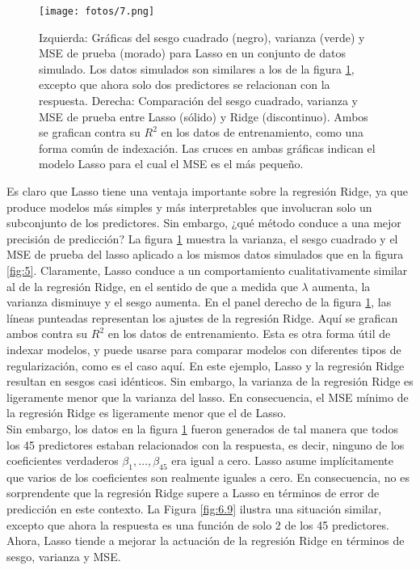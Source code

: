 \begin{figure}[h]
\centering
\texttt{[image: fotos/7.png]}
\caption{Izquierda: Gráficas del sesgo cuadrado (negro), varianza (verde) y MSE de prueba (morado) para Lasso en un conjunto de datos simulado. Los datos simulados son similares a los de la figura \ref{fig:6.8}, excepto que ahora solo dos predictores se relacionan con la respuesta. Derecha: Comparación del sesgo cuadrado, varianza y MSE de prueba entre Lasso (sólido) y Ridge (discontinuo). Ambos se grafican contra su $R^2$ en los datos de entrenamiento, como una forma común de indexación. Las cruces en ambas gráficas indican el modelo Lasso para el cual el MSE es el más pequeño.}
\label{fig:6.8}
\end{figure}

Es claro que Lasso tiene una ventaja importante sobre la regresión Ridge, ya que produce modelos más simples y más interpretables que involucran solo un subconjunto de los predictores. Sin embargo, ¿qué método conduce a una mejor precisión de predicción? La figura \ref{fig:6.8} muestra la varianza, el sesgo cuadrado y el MSE de prueba del lasso aplicado a los mismos datos simulados que en la figura \ref{fig:5}. Claramente, Lasso conduce a un comportamiento cualitativamente similar al de la regresión Ridge, en el sentido de que a medida que $\lambda$ aumenta, la varianza disminuye y el sesgo aumenta. En el panel derecho de la figura \ref{fig:6.8}, las líneas punteadas representan los ajustes de la regresión Ridge. Aquí se grafican ambos contra su $R^2$ en los datos de entrenamiento. Esta es otra forma útil de indexar modelos, y puede usarse para comparar modelos con diferentes tipos de regularización, como es el caso aquí. En este ejemplo, Lasso y la regresión Ridge resultan en sesgos casi idénticos. Sin embargo, la varianza de la regresión Ridge es ligeramente menor que la varianza del lasso. En consecuencia, el MSE mínimo de la regresión Ridge es ligeramente menor que el de Lasso. \\

Sin embargo, los datos en la figura \ref{fig:6.8} fueron generados de tal manera que todos los 45 predictores estaban relacionados con la respuesta, es decir, ninguno de los coeficientes verdaderos $\beta_1, \ldots, \beta_{45}$ era igual a cero. Lasso asume implícitamente que varios de los coeficientes son realmente iguales a cero. En consecuencia, no es sorprendente que la regresión Ridge supere a Lasso en términos de error de predicción en este contexto. La Figura \ref{fig:6.9} ilustra una situación similar, excepto que ahora la respuesta es una función de solo 2 de los 45 predictores. Ahora, Lasso tiende a mejorar la actuación de la regresión Ridge en términos de sesgo, varianza y MSE. 

